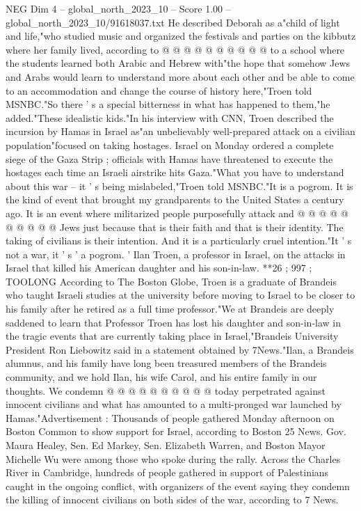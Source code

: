 \begin{textsample}{NEG Dim 4 – global\_north\_2023\_10 – Score 1.00 – global\_north\_2023\_10/91618037.txt}
He described Deborah as a"child of light and life,"who studied music and organized the festivals and parties on the kibbutz where her family lived, according to @ @ @ @ @ @ @ @ @ @ to a school where the students learned both Arabic and Hebrew with"the hope that somehow Jews and Arabs would learn to understand more about each other and be able to come to an accommodation and change the course of history here,"Troen told MSNBC."So there ' s a special bitterness in what has happened to them,"he added."These idealistic kids."In his interview with CNN, Troen described the incursion by Hamas in Israel as"an unbelievably well-prepared attack on a civilian population"focused on taking hostages.
Israel on Monday ordered a complete siege of the Gaza Strip ; officials with Hamas have threatened to execute the hostages each time an Israeli airstrike hits Gaza."What you have to understand about this war -- it ' s being mislabeled,"Troen told MSNBC."It is a pogrom.
It is the kind of event that brought my grandparents to the United States a century ago.
It is an event where militarized people purposefully attack and @ @ @ @ @ @ @ @ @ @ Jews just because that is their faith and that is their identity.
The taking of civilians is their intention.
And it is a particularly cruel intention."It ' s not a war, it ' s ' a pogrom. ' Ilan Troen, a professor in Israel, on the attacks in Israel that killed his American daughter and his son-in-law. **26 ; 997 ; TOOLONG According to The Boston Globe, Troen is a graduate of Brandeis who taught Israeli studies at the university before moving to Israel to be closer to his family after he retired as a full time professor."We at Brandeis are deeply saddened to learn that Professor Troen has lost his daughter and son-in-law in the tragic events that are currently taking place in Israel,"Brandeis University President Ron Liebowitz said in a statement obtained by 7News."Ilan, a Brandeis alumnus, and his family have long been treasured members of the Brandeis community, and we hold Ilan, his wife Carol, and his entire family in our thoughts.
We condemn @ @ @ @ @ @ @ @ @ @ today perpetrated against innocent civilians and what has amounted to a multi-pronged war launched by Hamas."Advertisement : Thousands of people gathered Monday afternoon on Boston Common to show support for Israel, according to Boston 25 News.
Gov.
Maura Healey, Sen.
Ed Markey, Sen.
Elizabeth Warren, and Boston Mayor Michelle Wu were among those who spoke during the rally.
Across the Charles River in Cambridge, hundreds of people gathered in support of Palestinians caught in the ongoing conflict, with organizers of the event saying they condemn the killing of innocent civilians on both sides of the war, according to 7 News.

\end{textsample}

